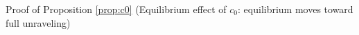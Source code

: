 Proof of Proposition \ref{prop:c0} (Equilibrium effect of $c_0$: equilibrium moves toward full unraveling)